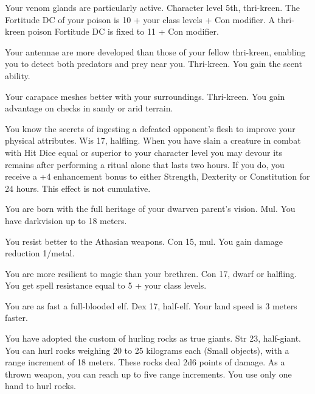 
{Your venom glands are particularly active.}
{Character level 5th, thri-kreen.}
{The Fortitude DC of your poison is 10 + \onehalf your class levels + Con modifier.}
{A thri-kreen poison Fortitude DC is fixed to 11 + Con modifier.}
{}

{Your antennae are more developed than those of your fellow thri-kreen, enabling you to detect both predators and prey near you.}
{Thri-kreen.}
{You gain the scent ability.}
{}{}

{Your carapace meshes better with your surroundings.}
{Thri-kreen.}
{You gain advantage on  checks in sandy or arid terrain.}
{}{}

{You know the secrets of ingesting a defeated opponent's flesh to improve your physical attributes.}
{Wis 17, halfling.}
{When you have slain a creature in combat with Hit Dice equal or superior to your character level you may devour its remains after performing a ritual alone that lasts two hours. If you do, you receive a +4 enhancement bonus to either Strength, Dexterity or Constitution for 24 hours. This effect is not cumulative.}
{}{}

{You are born with the full heritage of your dwarven parent's vision.}
{Mul.}
{You have darkvision up to 18 meters.}
{}{}

{You resist better to the Athasian weapons.}
{Con 15, mul.}
{You gain damage reduction 1/metal.}
{}{}

{You are more resilient to magic than your brethren.}
{Con 17, dwarf or halfling.}
{You get spell resistance equal to 5 + your class levels.}
{}{}

{You are as fast a full-blooded elf.}
{Dex 17, half-elf.}
{Your land speed is 3 meters faster.}
{}{}

{You have adopted the custom of hurling rocks as true giants.}
{Str 23, half-giant.}
{You can hurl rocks weighing 20 to 25 kilograms each (Small objects), with a range increment of 18 meters. These rocks deal 2d6 points of damage. As a thrown weapon, you can reach up to five range increments. You use only one hand to hurl rocks.}
{}
{}
